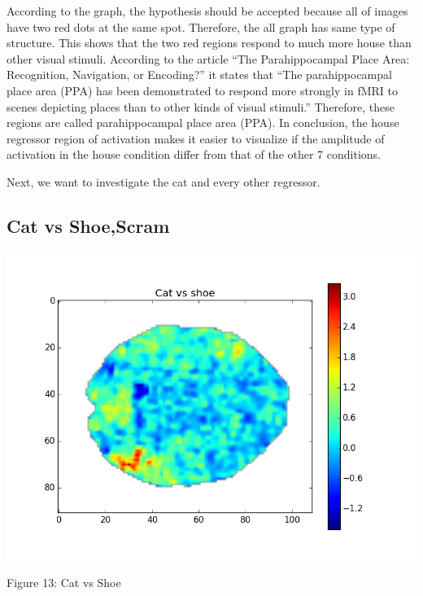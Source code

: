 \documentclass[12pt]{article}
\begin{document}
\begin{housevseverything}
\begin{housevseverything}
\end{housevseverything}

According to the graph, the hypothesis should be accepted because all of images have two red dots at the same spot. Therefore, the all graph has same type of structure. This shows that the two red regions respond to much more house than other visual stimuli. According to the article “The Parahippocampal Place Area: Recognition, Navigation, or Encoding?” \cite{epstein1999ppa} it states that “The parahippocampal place area (PPA) has been demonstrated to respond more strongly in fMRI to scenes depicting places than to other kinds of visual stimuli.” Therefore, these regions are called parahippocampal place area (PPA). In conclusion, the house regressor region of activation makes it easier to visualize if the amplitude of activation in the house condition differ from that of the other 7 conditions. 

Next, we want to investigate the cat and every other regressor. 

\subsection{Cat vs Shoe,Scram}

\begin{housevseverything}
    \centering
      \includegraphics{cat_vs_shoe}
    \caption{Figure 13: Cat vs Shoe}
    


\end{housevseverything}
\end{housevseverything}
\end{document}
